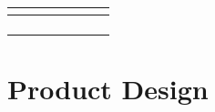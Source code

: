\documentclass[fleqn,10pt]{project}
\begin{document}
\begin{landscape}
\begin{table}[!h]
\begin{tabular}{|cccccccc|}
\multicolumn{1}{|l|}{}                                                                                & \multicolumn{1}{l|}{}         & \multicolumn{1}{l|}{}                        & \multicolumn{1}{l|}{}         & \multicolumn{1}{l|}{}                           & \multicolumn{1}{l|}{}                        & \multicolumn{1}{l|}{}                    & \multicolumn{1}{l|}{}    \\ \hline
\multicolumn{1}{|l|}{}                                                                                & \multicolumn{1}{l|}{}         & \multicolumn{1}{l|}{}                        & \multicolumn{1}{l|}{}         & \multicolumn{1}{l|}{}                           & \multicolumn{1}{l|}{}                        & \multicolumn{1}{l|}{}                    & \multicolumn{1}{l|}{}    \\ \hline
\multicolumn{1}{|l|}{}                                                                                & \multicolumn{1}{l|}{}         & \multicolumn{1}{l|}{}                        & \multicolumn{1}{l|}{}         & \multicolumn{1}{l|}{}                           & \multicolumn{1}{l|}{}                        & \multicolumn{1}{l|}{}                    & \multicolumn{1}{l|}{}    \\ \hline
\multicolumn{1}{|l|}{}                                                                                & \multicolumn{1}{l|}{}         & \multicolumn{1}{l|}{}                        & \multicolumn{1}{l|}{}         & \multicolumn{1}{l|}{}                           & \multicolumn{1}{l|}{}                        & \multicolumn{1}{l|}{}                    & \multicolumn{1}{l|}{}    \\ \hline
\multicolumn{1}{|l|}{}                                                                                & \multicolumn{1}{l|}{}         & \multicolumn{1}{l|}{}                        & \multicolumn{1}{l|}{}         & \multicolumn{1}{l|}{}                           & \multicolumn{1}{l|}{}                        & \multicolumn{1}{l|}{}                    & \multicolumn{1}{l|}{}    \\ \hline
\end{tabular}
\end{table}

\end{landscape}

\section{Product Design}
\end{document}
